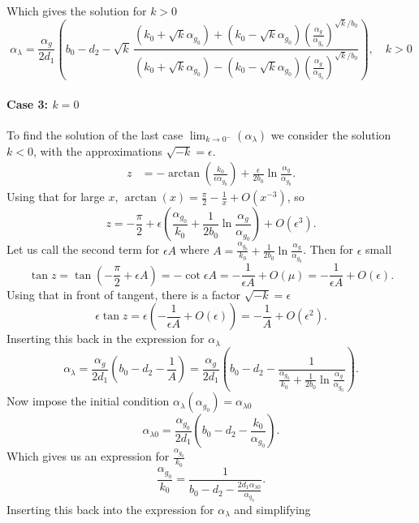 Which gives the solution for $k>0$
\begin{equation}
    \boxed{\alpha_{\lambda} = \frac{\alpha_g}{2d_1} \left( b_0 - d_2 - \sqrt{k} \, \frac{ (k_0 + \sqrt{k}\alpha_{g_0}) + (k_0 - \sqrt{k}\alpha_{g_0}) \left( \frac{\alpha_g}{\alpha_{g_0}} \right)^{\sqrt{k}/b_0} }{ (k_0 + \sqrt{k}\alpha_{g_0}) - (k_0 - \sqrt{k}\alpha_{g_0}) \left( \frac{\alpha_g}{\alpha_{g_0}} \right)^{\sqrt{k}/b_0} } \right) , \quad k>0 }
    \label{eq:alphalamkg0}
\end{equation}

\paragraph{Case 3: $k = 0$}
To find the solution of the last case $\lim_{k \to 0^-}(\alpha_\lambda)$ we consider the solution $k<0$, with the approximations $\sqrt{-k} =\epsilon$.
\begin{align*}
z &= -\arctan\left( \frac{k_0}{\epsilon\alpha_{g_0}} \right) + \frac{\epsilon}{2b_0} \ln\frac{\alpha_g}{\alpha_{g_0}} .
\end{align*}
Using that for large $x$, $\arctan(x) = \frac{\pi}{2} - \frac{1}{x} + O(x^{-3})$, so
\[
z = -\frac{\pi}{2} +\epsilon\left( \frac{\alpha_{g_0}}{k_0} + \frac{1}{2b_0}\ln\frac{\alpha_g}{\alpha_{g_0}}\right) + O(\epsilon^3) .
\]
Let us call the second term for $\epsilon A$ where $A = \frac{\alpha_{g_0}}{k_0} + \frac{1}{2b_0}\ln\frac{\alpha_g}{\alpha_{g_0}}$. Then for $\epsilon$ small
\[
\tan z = \tan\left(-\frac{\pi}{2} + \epsilon A\right) = -\cot\epsilon A = -\frac{1}{\epsilon A} + O(\mu) = -\frac{1}{\epsilon A} + O(\epsilon) .
\]
Using that in front of tangent, there is a factor $\sqrt {-k}=\epsilon$
\[
\epsilon \tan z = \epsilon \left( -\frac{1}{\epsilon A} + O(\epsilon) \right) = -\frac{1}{A} + O(\epsilon^2) .
\]
Inserting this back in the expression for $\alpha_\lambda$
\[
\alpha_{\lambda} = \frac{\alpha_g}{2d_1} \left( b_0 - d_2 - \frac{1}{A} \right) = \frac{\alpha_g}{2d_1} \left( b_0 - d_2 - \frac{1}{ \frac{\alpha_{g_0}}{k_0} + \frac{1}{2b_0}\ln\frac{\alpha_g}{\alpha_{g_0}} } \right) .
\]
Now impose the initial condition $\alpha_{\lambda}(\alpha_{g_0}) = \alpha_{\lambda0}$
\[
\alpha_{\lambda0} = \frac{\alpha_{g_0}}{2d_1} \left( b_0 - d_2 - \frac{k_0}{\alpha_{g_0}} \right) .
\]
Which gives us an expression for $\frac{\alpha_{g_0}}{k_0}$
\[
\frac{\alpha_{g_0}}{k_0} = \frac{1}{b_0 - d_2 - \frac{2d_1\alpha_{\lambda0}}{\alpha_{g_0}}} .
\]
Inserting this back into the expression for $\alpha_\lambda$ and simplifying
